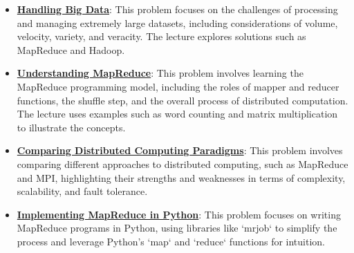 \documentclass{article}%
\begin{document}
\begin{itemize}[leftmargin=*]%
\item \href{https://purdue.brightspace.com/d2l/common/assets/pdfjs-d2l-dist/1.0.14-legacy/web/viewer.html?file=\%2Fcontent\%2Fenforced\%2F1095465-WL.202510.CS24200.LE1\%2F21L2-data-engineering.pdf\%3Fou\%3D1095465\&lang=en-us\&container=d2l-fileviewer-rendered-pdf\&fullscreen=d2l-fileviewer-rendered-pdf-dialog\&height=667#page=3}{\textbf{Handling Big Data}}: This problem focuses on the challenges of processing and managing extremely large datasets, including considerations of volume, velocity, variety, and veracity. The lecture explores solutions such as MapReduce and Hadoop.%
\item \href{https://purdue.brightspace.com/d2l/common/assets/pdfjs-d2l-dist/1.0.14-legacy/web/viewer.html?file=\%2Fcontent\%2Fenforced\%2F1095465-WL.202510.CS24200.LE1\%2F21L2-data-engineering.pdf\%3Fou\%3D1095465\&lang=en-us\&container=d2l-fileviewer-rendered-pdf\&fullscreen=d2l-fileviewer-rendered-pdf-dialog\&height=667#page=10}{\textbf{Understanding MapReduce}}: This problem involves learning the MapReduce programming model, including the roles of mapper and reducer functions, the shuffle step, and the overall process of distributed computation. The lecture uses examples such as word counting and matrix multiplication to illustrate the concepts.%
\item \href{https://purdue.brightspace.com/d2l/common/assets/pdfjs-d2l-dist/1.0.14-legacy/web/viewer.html?file=\%2Fcontent\%2Fenforced\%2F1095465-WL.202510.CS24200.LE1\%2F21L2-data-engineering.pdf\%3Fou\%3D1095465\&lang=en-us\&container=d2l-fileviewer-rendered-pdf\&fullscreen=d2l-fileviewer-rendered-pdf-dialog\&height=667#page=26}{\textbf{Comparing Distributed Computing Paradigms}}: This problem involves comparing different approaches to distributed computing, such as MapReduce and MPI, highlighting their strengths and weaknesses in terms of complexity, scalability, and fault tolerance.%
\item \href{https://purdue.brightspace.com/d2l/common/assets/pdfjs-d2l-dist/1.0.14-legacy/web/viewer.html?file=\%2Fcontent\%2Fenforced\%2F1095465-WL.202510.CS24200.LE1\%2F21L2-data-engineering.pdf\%3Fou\%3D1095465\&lang=en-us\&container=d2l-fileviewer-rendered-pdf\&fullscreen=d2l-fileviewer-rendered-pdf-dialog\&height=667#page=32}{\textbf{Implementing MapReduce in Python}}: This problem focuses on writing MapReduce programs in Python, using libraries like `mrjob` to simplify the process and leverage Python's `map` and `reduce` functions for intuition.%
\end{itemize}%
\end{document}
